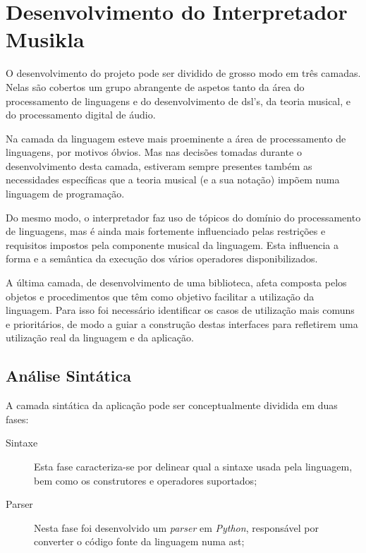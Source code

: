 \chapter{Desenvolvimento do Interpretador Musikla}
O desenvolvimento do projeto pode ser dividido de grosso modo em três camadas. Nelas são cobertos um grupo abrangente de aspetos tanto da área do processamento de linguagens e do desenvolvimento de \acrshort{dsl}'s, da teoria musical, e do processamento digital de áudio. 

Na camada da linguagem esteve mais proeminente a área de processamento de linguagens, por motivos óbvios. Mas nas decisões tomadas durante o desenvolvimento desta camada, estiveram sempre presentes também as necessidades específicas que a teoria musical (e a sua notação) impõem numa linguagem de programação.

Do mesmo modo, o interpretador faz uso de tópicos do domínio do processamento de linguagens, mas é ainda mais fortemente influenciado pelas restrições  e requisitos impostos pela componente musical da linguagem. Esta influencia a forma e a semântica da execução dos vários operadores disponibilizados.

A última camada, de desenvolvimento de uma biblioteca, afeta composta pelos objetos e procedimentos que têm como objetivo facilitar a utilização da linguagem. Para isso foi necessário identificar os casos de utilização mais comuns e prioritários, de modo a guiar a construção destas interfaces para refletirem uma utilização real da linguagem e da aplicação.

\section{Análise Sintática}
A camada sintática da aplicação pode ser conceptualmente dividida em duas fases:
\begin{description}
    \item[Sintaxe] Esta fase caracteriza-se por delinear qual a sintaxe usada pela linguagem, bem como os construtores e operadores suportados;
    \item[Parser] Nesta fase foi desenvolvido um \textit{parser} em \textit{Python}, responsável por converter o código fonte da linguagem numa \acrfull{ast};
\end{description}


